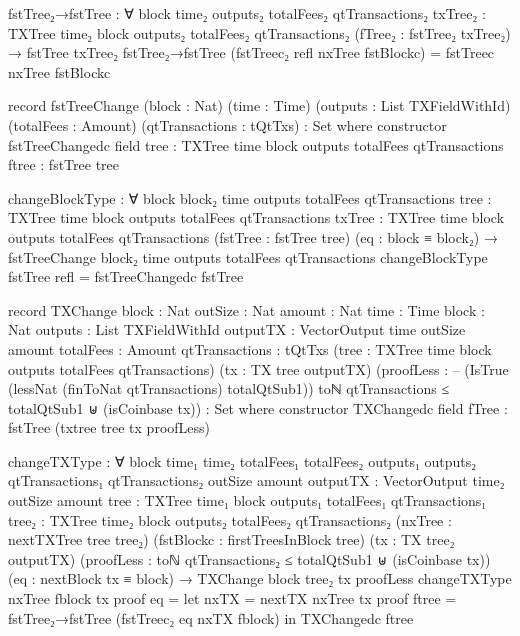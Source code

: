 \documentclass{beamer}
\begin{document}
\begin{code}
    fstTree₂→fstTree : ∀
      {block time₂ outputs₂ totalFees₂ qtTransactions₂}
      {txTree₂ : TXTree time₂ block outputs₂ totalFees₂ qtTransactions₂}
      (fTree₂ : fstTree₂ txTree₂)
      → fstTree txTree₂
    fstTree₂→fstTree (fstTreec₂ refl nxTree fstBlockc) = fstTreec nxTree fstBlockc

    record fstTreeChange
      (block : Nat)
      (time : Time)
      (outputs : List TXFieldWithId)
      (totalFees : Amount)
      (qtTransactions : tQtTxs)
      : Set where
      constructor fstTreeChangedc
      field
        {tree}      : TXTree time block outputs totalFees qtTransactions
        ftree       : fstTree tree

    changeBlockType : ∀
      {block block₂ time outputs totalFees qtTransactions}
      {tree : TXTree time block outputs totalFees qtTransactions}
      {txTree : TXTree time block outputs totalFees qtTransactions}
      (fstTree : fstTree tree)
      (eq : block ≡ block₂)
      → fstTreeChange block₂ time outputs totalFees qtTransactions
    changeBlockType fstTree refl = fstTreeChangedc fstTree

    record TXChange
      {block : Nat}
      {outSize : Nat}
      {amount : Nat}
      {time : Time}
      {block : Nat}
      {outputs : List TXFieldWithId}
      {outputTX : VectorOutput time outSize amount}
      {totalFees : Amount}
      {qtTransactions : tQtTxs}
      (tree : TXTree time block outputs totalFees qtTransactions)
      (tx : TX tree outputTX)
      (proofLess :
        -- (IsTrue (lessNat (finToNat qtTransactions) totalQtSub1))
        toℕ qtTransactions ≤ totalQtSub1
        ⊎
        (isCoinbase tx))
      : Set where
      constructor TXChangedc
      field
        fTree                 : fstTree (txtree tree tx proofLess)


    changeTXType : ∀
      {block time₁ time₂ totalFees₁ totalFees₂ outputs₁ outputs₂ qtTransactions₁ qtTransactions₂
      outSize amount}
      {outputTX : VectorOutput time₂ outSize amount}
      {tree : TXTree time₁ block outputs₁ totalFees₁ qtTransactions₁}
      {tree₂ : TXTree time₂ block outputs₂ totalFees₂ qtTransactions₂}
      (nxTree : nextTXTree tree tree₂)
      (fstBlockc : firstTreesInBlock tree)
      (tx : TX tree₂ outputTX)
      (proofLess :
        toℕ qtTransactions₂ ≤ totalQtSub1
        ⊎
        (isCoinbase tx))
      (eq : nextBlock tx ≡ block)
      → TXChange {block} tree₂ tx proofLess
    changeTXType nxTree fblock tx proof eq =
      let nxTX = nextTX nxTree tx proof
          ftree = fstTree₂→fstTree (fstTreec₂ eq nxTX fblock)
      in TXChangedc ftree



\end{code}
\end{document}
